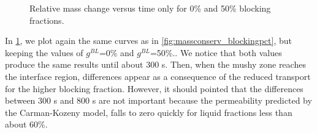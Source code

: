 \begin{figure}[htbp]
\centering
{}
\caption{Relative mass change versus time only for 0\% and 50\% blocking fractions.}
\label{fig:massconserv_blockingpct2}
\end{figure}



In \cref{fig:massconserv_blockingpct2}, we plot again the same curves as in \cref{fig:massconserv_blockingpct}, but keeping the values of $g^{BL}$=0\% and $g^{BL}$=50\%..
We notice that both values produce the same results until about 300 s. Then, when the mushy zone reaches the interface region, differences appear as a consequence
of the reduced transport for the higher blocking fraction. However, it should pointed that the differences between 300 s and 800 s are not important because the permeability
predicted by the Carman-Kozeny model, falls to zero quickly for liquid fractions less than about 60\%. 

